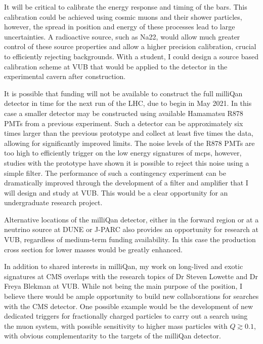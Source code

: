 \documentclass[11pt]{article}
\theoremstyle{plain} \numberwithin{equation}{section}
\theoremstyle{definition}
\begin{document}
It will be critical to calibrate the energy response and timing of the bars. 
This calibration could be achieved using cosmic muons and their shower particles, 
however, the spread in position and energy of these processes
lead to large uncertainties. A radioactive source, such as Na22, would allow much greater control 
of these source properties and allow a higher precision calibration, crucial to efficiently 
rejecting backgrounds. With a student, I could design a source based calibration scheme 
at VUB that would be applied to the detector in the experimental cavern after construction.

It is possible that funding will not be available to construct the full milliQan detector in
time for the next run of the LHC, due to begin in May 2021. In this case a smaller 
detector may be constructed using available Hamamatsu R878 PMTs from a previous experiment. 
Such a detector can be approximately six times
larger than the previous prototype and collect at least five times the data, allowing for
significantly improved limits. The noise levels of the R878 PMTs are too high to efficiently 
trigger on the low energy signatures of mcps, however, studies with the prototype
have shown it is possible to reject this noise using a simple filter. The performance of
such a contingency experiment can be dramatically improved through the development of a
filter and amplifier that I will design and study at VUB. This would be a clear opportunity 
for an undergraduate research project.

Alternative locations of the milliQan detector, either in the forward region or at a neutrino source 
at DUNE or J-PARC also provides an opportunity for research at VUB, 
regardless of medium-term funding availability. In this case the production cross 
section for lower masses would be greatly enhanced.

In addition to shared interests in milliQan, my work on long-lived and exotic signatures
at CMS overlaps with the research topics of Dr Steven Lowette and Dr Freya Blekman at VUB. 
While not being the main purpose of the position, I believe there would be ample opportunity
to build new collaborations for searches with the CMS detector. One possible example
would be the development of new dedicated triggers for fractionally 
charged particles to carry out a search using the muon system, with possible 
sensitivity to higher mass particles with $Q \gtrsim 0.1$, with obvious complementarity 
to the targets of the milliQan detector.
\end{document}

